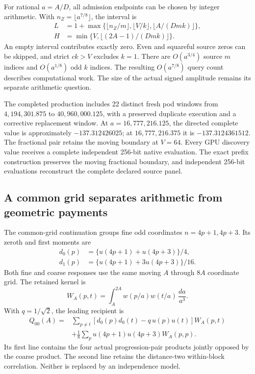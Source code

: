 For rational \(a=A/D\), all admission endpoints can be chosen by
integer arithmetic. With \(n_Z=\lfloor a^{7/8}\rfloor\), the interval is
\[
\begin{aligned}
 L&=1+\max\{\lfloor n_Z/m\rfloor,
           \lfloor V/k\rfloor,
           \lfloor A/(Dmk)\rfloor\},\\
 H&=\min\{V,\lfloor(2A-1)/(Dmk)\rfloor\}.
\end{aligned}
\]
An empty interval contributes exactly zero. Even and squareful source
zeros can be skipped, and strict \(ck>V\) excludes \(k=1\).
There are \(O(a^{3/4})\) source \(m\) indices and \(O(a^{1/8})\)
odd \(k\) indices. The resulting \(O(a^{7/8})\) query count describes
computational work. The size of the actual signed amplitude remains
its separate arithmetic question.

The completed production includes 22 distinct fresh pod windows from
\(4{,}194{,}301.875\) to \(40{,}960{,}000.125\), with a preserved
duplicate execution and a corrective replacement window. At
\(a=16{,}777{,}216.125\), the directed complete value is approximately
\(-137.312426025\); at \(16{,}777{,}216.375\) it is
\(-137.3124361512\). The fractional pair retains the moving boundary
at \(V=64\). Every GPU discovery value receives a complete independent
256-bit native evaluation. The exact prefix construction preserves the moving fractional boundary, and independent 256-bit evaluations reconstruct the complete declared source panel.

\subsection{A common grid separates arithmetic from geometric payments}

The common-grid continuation groups fine odd coordinates
\(n=4p+1,4p+3\). Its zeroth and first moments are
\[
\begin{aligned}
 d_0(p)&=\{u(4p+1)+u(4p+3)\}/4,\\
 d_1(p)&=\{u(4p+1)+3u(4p+3)\}/16.
\end{aligned}
\]
Both fine and coarse responses use the same moving \(A\) through
\(8A\) coordinate grid. The retained kernel is
\[
 W_A(p,t)=\int_A^{2A}
       w(p/a)w(t/a)\,\frac{da}{a^3}.
\]
With \(q=1/\sqrt2\), the leading recipient is
\[
\begin{aligned}
 Q_{00}(A)={}&\sum_{p\ne t}
 [d_0(p)d_0(t)-q\,u(p)u(t)]W_A(p,t)\\
 &+\frac18\sum_pu(4p+1)u(4p+3)W_A(p,p).
\end{aligned}
\]
Its first line contains the four actual progression-pair products
jointly opposed by the coarse product. The second line retains the
distance-two within-block correlation. Neither is replaced by an
independence model.

